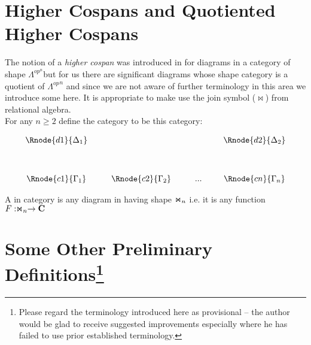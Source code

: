 \documentclass[10pt,a4paper]{scrartcl}
\begin{document}
\section{Higher Cospans and Quotiented Higher Cospans}
The notion of a \textit{higher cospan} was
 introduced in \cite{Grandis2007} for diagrams
in a category of shape $\Lambda^{op^n}$but for us there are significant diagrams whose 
shape category is a quotient of  ${\Lambda^{op}}^n$ and since we are not aware
of further terminology in this area we introduce some here. It is appropriate to make use the join symbol ($\Join$) from relational algebra. \\

\noindent For any $n \geq 2$ define the category \ndidly to be this category:

\begin{center}
\begin{displaymath}
\begin{array}{cp{0.3cm}c         p{0.3cm}  c p{0.2cm} c}
\Rnode{d1}{\Delta_1}& &               & &     & &\Rnode{d2}{\Delta_2}  \\ [1.2cm]
\Rnode{c1}{\Gamma_1}& &\Rnode{c2}{\Gamma_2}& & ... & &\Rnode{cn}{\Gamma_n}
\end{array}
\end{displaymath}
\end{center}

\begin{definition}
A \textit{\ndidlycospan}
 in category   is any diagram in  having 
shape $\Join_n$  i.e. it is any function $F: \Join_n \rightarrow \textbf{C}$
\end{definition}

\section{ Some Other Preliminary Definitions\protect\footnote{Please regard the terminology introduced here as provisional -- the author would be glad to receive suggested improvements especially where he has failed to use prior established terminology.}}
\end{document}
